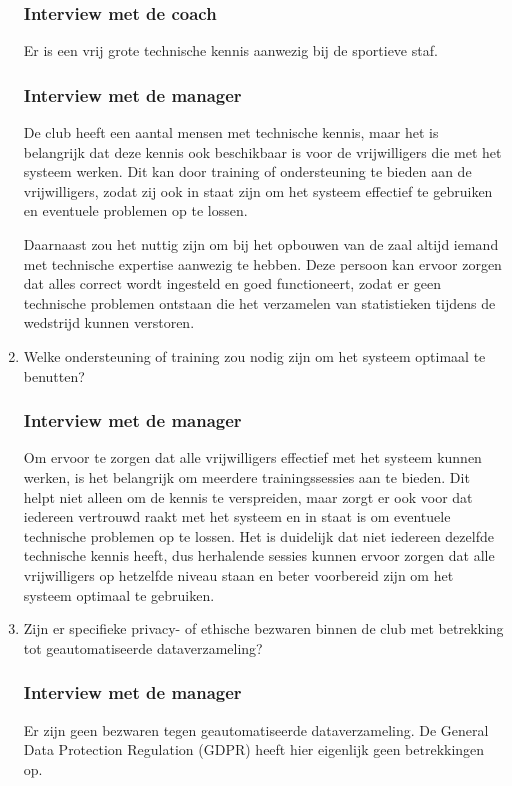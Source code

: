 \begin{enumerate}
  \subsubsection{Interview met de coach}
  Er is een vrij grote technische kennis aanwezig bij de sportieve staf.
  \subsubsection{Interview met de manager}
  De club heeft een aantal mensen met technische kennis, maar het is belangrijk dat deze kennis ook beschikbaar is voor de vrijwilligers die met het systeem werken. Dit kan door training of ondersteuning te bieden aan de vrijwilligers, zodat zij ook in staat zijn om het systeem effectief te gebruiken en eventuele problemen op te lossen.

  Daarnaast zou het nuttig zijn om bij het opbouwen van de zaal altijd iemand met technische expertise aanwezig te hebben. Deze persoon kan ervoor zorgen dat alles correct wordt ingesteld en goed functioneert, zodat er geen technische problemen ontstaan die het verzamelen van statistieken tijdens de wedstrijd kunnen verstoren.
  \item Welke ondersteuning of training zou nodig zijn om het systeem optimaal te benutten?
  \subsubsection{Interview met de manager}
  Om ervoor te zorgen dat alle vrijwilligers effectief met het systeem kunnen werken, is het belangrijk om meerdere trainingssessies aan te bieden. Dit helpt niet alleen om de kennis te verspreiden, maar zorgt er ook voor dat iedereen vertrouwd raakt met het systeem en in staat is om eventuele technische problemen op te lossen. Het is duidelijk dat niet iedereen dezelfde technische kennis heeft, dus herhalende sessies kunnen ervoor zorgen dat alle vrijwilligers op hetzelfde niveau staan en beter voorbereid zijn om het systeem optimaal te gebruiken.
  \item Zijn er specifieke privacy- of ethische bezwaren binnen de club met betrekking tot geautomatiseerde dataverzameling?
  \subsubsection{Interview met de manager}
  Er zijn geen bezwaren tegen geautomatiseerde dataverzameling. De General Data Protection Regulation (GDPR) heeft hier eigenlijk geen betrekkingen op.
\end{enumerate}

